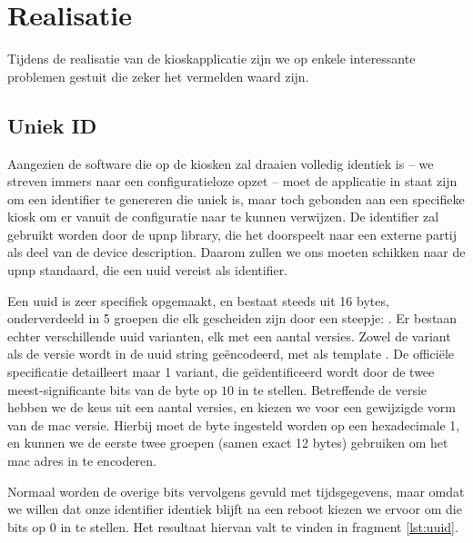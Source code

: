 \chapter{Realisatie}
\label{kiosk:realisatie}

Tijdens de realisatie van de kioskapplicatie zijn we op enkele interessante problemen gestuit die zeker het vermelden waard zijn.

\section{Uniek ID}
\label{kiosk:realisatie:id}

Aangezien de software die op de kiosken zal draaien volledig identiek is -- we streven immers naar een configuratieloze opzet -- moet de applicatie in staat zijn om een identifier te genereren die uniek is, maar toch gebonden aan een specifieke kiosk om er vanuit de configuratie naar te kunnen verwijzen. De identifier zal gebruikt worden door de \ac{upnp} library, die het doorspeelt naar een externe partij als deel van de device description. Daarom zullen we ons moeten schikken naar de \ac{upnp} standaard, die een \ac{uuid} vereist als identifier.

Een \ac{uuid} is zeer specifiek opgemaakt, en bestaat steeds uit 16 bytes, onderverdeeld in 5 groepen die elk gescheiden zijn door een steepje: . Er bestaan echter verschillende \ac{uuid} varianten, elk met een aantal versies. Zowel de variant als de versie wordt in de \ac{uuid} string geëncodeerd, met als template . De officiële specificatie detailleert maar 1 variant, die geïdentificeerd wordt door de twee meest-significante bits van de  byte op $1 0$ in te stellen. Betreffende de versie hebben we de keus uit een aantal versies, en kiezen we voor een gewijzigde vorm van de \ac{mac} versie. Hierbij moet de  byte ingesteld worden op een hexadecimale 1, en kunnen we de eerste twee groepen (samen exact 12 bytes) gebruiken om het \ac{mac} adres in te encoderen.

Normaal worden de overige bits vervolgens gevuld met tijdsgegevens, maar omdat we willen dat onze identifier identiek blijft na een reboot kiezen we ervoor om die bits op 0 in te stellen. Het resultaat hiervan valt te vinden in fragment \ref{lst:uuid}.

